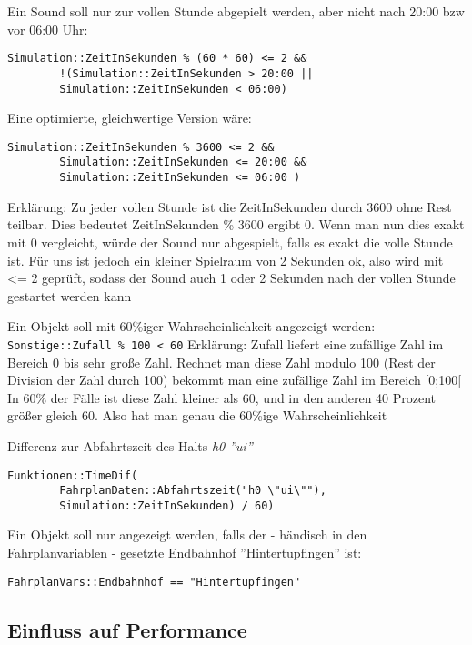 Ein Sound soll nur zur vollen Stunde abgepielt werden, aber nicht nach
20:00 bzw vor 06:00 Uhr:

\begin{lstlisting}
Simulation::ZeitInSekunden % (60 * 60) <= 2 &&
        !(Simulation::ZeitInSekunden > 20:00 ||
        Simulation::ZeitInSekunden < 06:00)
\end{lstlisting}

Eine optimierte, gleichwertige Version wäre:

\begin{lstlisting}
Simulation::ZeitInSekunden % 3600 <= 2 &&
        Simulation::ZeitInSekunden <= 20:00 &&
        Simulation::ZeitInSekunden <= 06:00 )
\end{lstlisting}
				
Erklärung: Zu jeder vollen Stunde ist die ZeitInSekunden durch 3600 ohne Rest
teilbar. Dies bedeutet ZeitInSekunden \% 3600 ergibt 0. Wenn man nun
dies exakt mit 0 vergleicht, würde der Sound nur abgespielt, falls es
exakt die volle Stunde ist. Für uns ist jedoch ein kleiner Spielraum von
2 Sekunden ok, also wird mit \textless{}= 2 geprüft, sodass der Sound
auch 1 oder 2 Sekunden nach der vollen Stunde gestartet werden kann

Ein Objekt soll mit 60\%iger Wahrscheinlichkeit angezeigt werden:
\texttt{Sonstige::Zufall \% 100 \textless{} 60} Erklärung: Zufall
liefert eine zufällige Zahl im Bereich 0 bis sehr große Zahl. Rechnet
man diese Zahl modulo 100 (Rest der Division der Zahl durch 100) bekommt
man eine zufällige Zahl im Bereich {[}0;100{[} In 60\% der Fälle ist
diese Zahl kleiner als 60, und in den anderen 40 Prozent größer gleich
60. Also hat man genau die 60\%ige Wahrscheinlichkeit

Differenz zur Abfahrtszeit des Halts \emph{h0 ''ui''}

\begin{lstlisting}
Funktionen::TimeDif( 
        FahrplanDaten::Abfahrtszeit("h0 \"ui\""), 
        Simulation::ZeitInSekunden) / 60)
\end{lstlisting}

Ein Objekt soll nur angezeigt werden, falls der - händisch in den Fahrplanvariablen - gesetzte Endbahnhof ''Hintertupfingen'' ist:

\begin{lstlisting}
FahrplanVars::Endbahnhof == "Hintertupfingen"
\end{lstlisting}

\subsection{Einfluss auf Performance}

